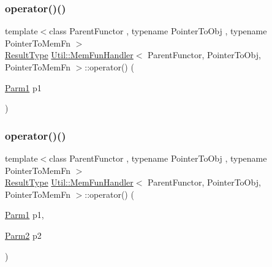 \mbox{\label{classUtil_1_1MemFunHandler_a5d20125065c3cc89ca77c0c546923523}} 
\subsubsection{\texorpdfstring{operator()()}{operator()()}\hspace{0.1cm}{\footnotesize\ttfamily [4/12]}}
{\footnotesize\ttfamily template$<$class Parent\+Functor , typename Pointer\+To\+Obj , typename Pointer\+To\+Mem\+Fn $>$ \\
\mbox{\hyperlink{classUtil_1_1MemFunHandler_a093690dcced95ad48c5429e50006c83e}{Result\+Type}} \mbox{\hyperlink{classUtil_1_1MemFunHandler}{Util\+::\+Mem\+Fun\+Handler}}$<$ Parent\+Functor, Pointer\+To\+Obj, Pointer\+To\+Mem\+Fn $>$\+::operator() (\begin{DoxyParamCaption}\item[{\mbox{\hyperlink{classUtil_1_1MemFunHandler_a43182733677fc623d89e5613ecf15761}{Parm1}}}]{p1 }\end{DoxyParamCaption})\hspace{0.3cm}{\ttfamily [inline]}}

\mbox{\label{classUtil_1_1MemFunHandler_a193366447f7adcd2efceddfdefce2f9a}} 
\subsubsection{\texorpdfstring{operator()()}{operator()()}\hspace{0.1cm}{\footnotesize\ttfamily [5/12]}}
{\footnotesize\ttfamily template$<$class Parent\+Functor , typename Pointer\+To\+Obj , typename Pointer\+To\+Mem\+Fn $>$ \\
\mbox{\hyperlink{classUtil_1_1MemFunHandler_a093690dcced95ad48c5429e50006c83e}{Result\+Type}} \mbox{\hyperlink{classUtil_1_1MemFunHandler}{Util\+::\+Mem\+Fun\+Handler}}$<$ Parent\+Functor, Pointer\+To\+Obj, Pointer\+To\+Mem\+Fn $>$\+::operator() (\begin{DoxyParamCaption}\item[{\mbox{\hyperlink{classUtil_1_1MemFunHandler_a43182733677fc623d89e5613ecf15761}{Parm1}}}]{p1,  }\item[{\mbox{\hyperlink{classUtil_1_1MemFunHandler_a9d454c62047cb4bff3173b5bda9a38c8}{Parm2}}}]{p2 }\end{DoxyParamCaption})\hspace{0.3cm}{\ttfamily [inline]}}

